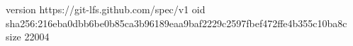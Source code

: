version https://git-lfs.github.com/spec/v1
oid sha256:216eba0dbb6be0b85ca3b96189eaa9baf2229c2597fbef472ffe4b355c10ba8c
size 22004
